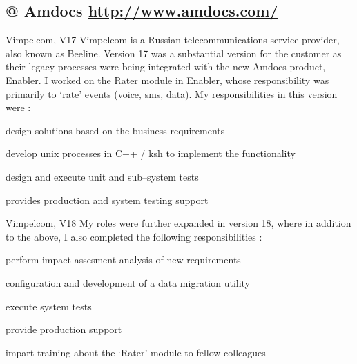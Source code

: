 \documentclass[a4paper,10pt,final]{article}
\newcommand{\resumetitle}[1]{%
	\subsection*{%
		\hspace{-5pt}\large#1%
	}%
	
	\medskip%
}%
\newenvironment{resumedescription}{%
	\begin{basedescript}{\desclabelstyle{\nextlinelabel}\desclabelwidth{0.15\linewidth}}{%
		\renewcommand{\makelabel}[1]{\textsl{##1}}%
	}%
	}{%
	\end{basedescript}%
}
\begin{document}
\resumetitle{@ Amdocs \hfill \small{\url{http://www.amdocs.com/}}}
	\begin{resumedescription}
		\item[Vimpelcom, V17]
			Vimpelcom is a Russian telecommunications service provider, also known as Beeline. Version 17 was a substantial version for the customer as their legacy processes were being integrated with the new Amdocs product, Enabler. I worked on the Rater module in Enabler, whose responsibility was primarily to `rate' events (voice, sms, data). My responsibilities in this version were :
			\begin{itemize*}
				\item design solutions based on the business requirements
				\item develop unix processes in C++ / ksh to implement the functionality
				\item design and execute unit and sub--system tests
				\item provides production and system testing support
			\end{itemize*}

		\item[Vimpelcom, V18]
			My roles were further expanded in version 18, where in addition to the above, I also completed the following responsibilities :
			\begin{itemize*}
				\item perform impact assesment analysis of new requirements
				\item configuration and development of a data migration utility
				\item execute system tests
				\item provide production support
				\item impart training about the `Rater' module to fellow colleagues
			\end{itemize*}
	\end{resumedescription}
\end{document}
